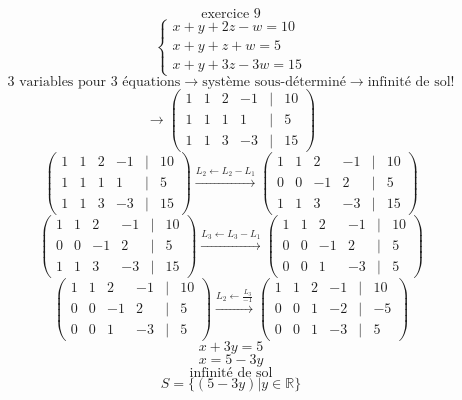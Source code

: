 \documentclass{article}
\begin{document}
\[ \text{exercice 9} \]
\[ \begin{cases} x + y + 2z - w = 10 \\ x + y + z + w = 5 \\ x + y + 3z - 3w = 15 \end{cases}\]
\[ \text{3 variables pour 3 équations} \rightarrow \text{système sous-déterminé} \rightarrow \text{infinité de sol!} \]
\[\rightarrow \begin{pmatrix} 1 & 1 & 2 & -1 & | & 10 \\ 1 & 1 & 1 & 1 & | & 5 \\ 1 & 1 & 3 & -3 & | & 15 \end{pmatrix} \]
\[ \begin{pmatrix} 1 & 1 & 2 & -1 & | & 10 \\ 1 & 1 & 1 & 1 & | & 5 \\ 1 & 1 & 3 & -3 & | & 15 \end{pmatrix} \xrightarrow{L_2 \leftarrow L_2 - L_1} \begin{pmatrix} 1 & 1 & 2 & -1 & | & 10 \\ 0 & 0 & -1 & 2 & | & 5 \\ 1 & 1 & 3 & -3 & | & 15 \end{pmatrix} \]
\[ \begin{pmatrix} 1 & 1 & 2 & -1 & | & 10 \\ 0 & 0 & -1 & 2 & | & 5 \\ 1 & 1 & 3 & -3 & | & 15 \end{pmatrix} \xrightarrow{L_3 \leftarrow L_3 - L_1} \begin{pmatrix} 1 & 1 & 2 & -1 & | & 10 \\ 0 & 0 & -1 & 2 & | & 5 \\ 0 & 0 & 1 & -3 & | & 5 \end{pmatrix} \]
\[ \begin{pmatrix} 1 & 1 & 2 & -1 & | & 10 \\ 0 & 0 & -1 & 2 & | & 5 \\ 0 & 0 & 1 & -3 & | & 5 \end{pmatrix} \xrightarrow{L_2 \leftarrow \frac{L_3}{-1}} \begin{pmatrix} 1 & 1 & 2 & -1 & | & 10 \\ 0 & 0 & 1 & -2 & | & -5 \\ 0 & 0 & 1 & -3 & | & 5 \end{pmatrix} \]
\[ x + 3y = 5 \]
\[ x = 5 - 3y \]
\[ \text{infinité de sol} \]
\[ S = \{ (5-3y) | y \in \mathbb{R} \} \]
\end{document}
